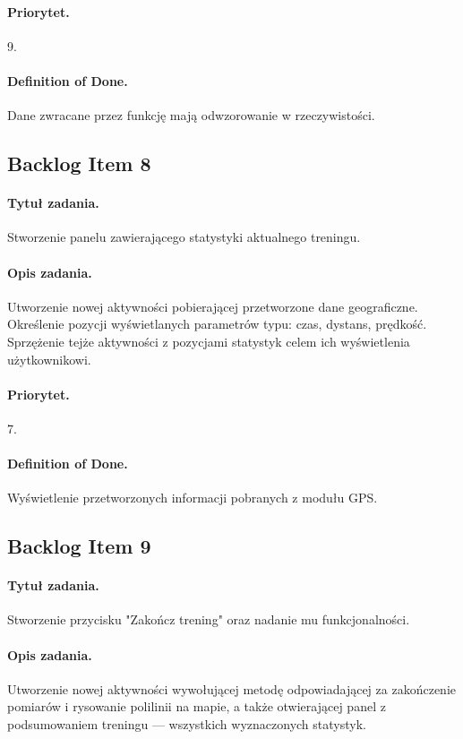 \documentclass[a4paper]{article}
\begin{document}
\paragraph{Priorytet.} 9.
\paragraph{Definition of Done.} Dane zwracane przez funkcję mają odwzorowanie w rzeczywistości.

\subsection{Backlog Item 8}
\paragraph{Tytuł zadania.} Stworzenie panelu zawierającego statystyki aktualnego treningu.
\paragraph{Opis zadania.} Utworzenie nowej aktywności pobierającej przetworzone dane geograficzne. Określenie pozycji wyświetlanych parametrów typu: czas, dystans, prędkość. Sprzężenie tejże aktywności z pozycjami statystyk celem ich wyświetlenia użytkownikowi.
\paragraph{Priorytet.} 7.
\paragraph{Definition of Done.} Wyświetlenie przetworzonych informacji pobranych z modułu GPS.

\subsection{Backlog Item 9}
\paragraph{Tytuł zadania.} Stworzenie przycisku "Zakończ trening" oraz nadanie mu funkcjonalności.
\paragraph{Opis zadania.} Utworzenie nowej aktywności wywołującej metodę odpowiadającej za zakończenie pomiarów i rysowanie polilinii na mapie, a także otwierającej panel z podsumowaniem treningu --- wszystkich wyznaczonych statystyk.
\end{document}
